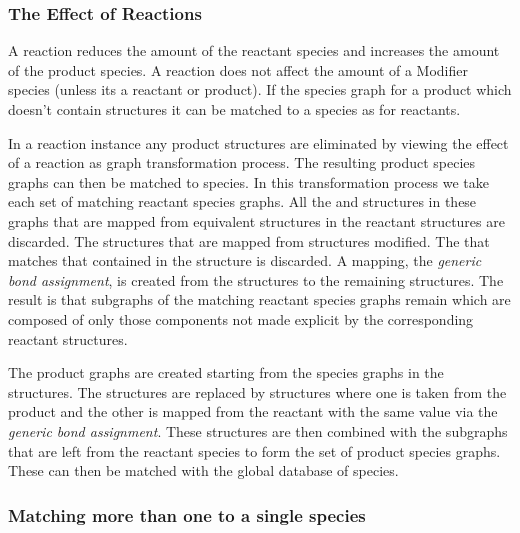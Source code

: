 \documentclass{cekarticle}
\begin{document}
\subsubsection{The Effect of Reactions}
\label{sec:effect-of-reactions}

A reaction reduces the amount of the reactant species and increases the amount of the product
species.  A reaction does not affect the amount of a Modifier species (unless its a reactant or product).
If the species graph for a product which doesn't contain  structures it can be
matched to a species as for reactants.

In a reaction instance any product  structures are eliminated by viewing the effect of
a reaction as graph transformation process.
The resulting product species graphs can then be matched to species.
In this transformation process we take each set of matching reactant species graphs.
All the  and  structures in these graphs that
are mapped from equivalent structures in the reactant  structures are discarded.
The  structures that are mapped from  structures
modified.  The  that matches that contained in the 
structure is discarded.  A mapping, the \emph{generic bond assignment}, is created from the
 structures to the remaining  structures.
The result is that subgraphs of the matching reactant species graphs remain which are composed of
only those components not made explicit by the corresponding
 reactant  structures.

The product graphs are created starting from the species graphs in the 
structures.  The  structures are replaced by  structures
where one  is taken from the product  and the other
 is mapped from the reactant  with the same 
value via the \emph{generic bond assignment}.  These structures are then combined with the
subgraphs that are left from the reactant species to form the set of product species graphs.
These can then be matched with the global database of species.

\subsubsection{Matching more than one  to a single species}
\end{document}
